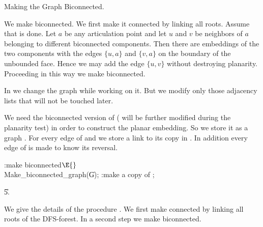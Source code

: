 Making the Graph Biconnected.

We make  biconnected. We first make it connected by linking all
roots. Assume that is done. Let $a$ be any articulation
point and let $u$ and $v$ be neighbors of $a$ belonging to different
biconnected components. Then there are embeddings of the two components
with the edges $\{u,a\}$ and $\{v,a\}$ on the boundary of the unbounded
face. Hence we may add the edge $\{u,v\}$ without destroying planarity.
Proceeding in this way we make 
biconnected.

In  we change the graph while working on it.
But we modify only
those adjacency lists that will not be touched later.

We need the biconnected version of  ( will be further modified
during the planarity test) in order to construct the planar embedding. So we
store it as a graph . For every edge of  and  we
store a link to
its copy in . In addition every edge of  is made to know its
reversal.

\Y\B\4:make  biconnected\X${}\E{}$\6
\\{Make\_biconnected\_graph}(\|G);\6
:make  a copy of \X;\par
\U5.\fi

We give the details of the procedure . We
first make 
connected by linking all roots of the DFS-forest. In a second step we make
 biconnected.

